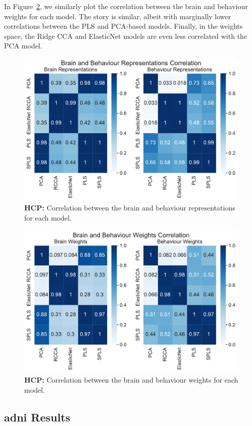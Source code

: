 In Figure~\ref{fig:brain-behaviour-weights-sim}, we similarly plot the correlation between the brain and behaviour \gls{weights} for each model. 
The story is similar, albeit with marginally lower correlations between the PLS and PCA-based models. Finally, in the weights space, the Ridge CCA and ElasticNet models are even less correlated with the PCA model.

\begin{figure}
    \centering
    \includegraphics[width=0.8\linewidth]{figures/hcp/brain and behaviour scores correlation}
    \caption{\textbf{HCP:} Correlation between the brain and behaviour \gls{representations} for each model.}\label{fig:brain-behaviour-scores-sim}
\end{figure}

\begin{figure}
    \centering
    \includegraphics[width=0.8\linewidth]{figures/hcp/brain and behaviour weights correlation}
    \caption{\textbf{HCP:} Correlation between the brain and behaviour \gls{weights} for each model.}\label{fig:brain-behaviour-weights-sim}
\end{figure}


\subsection{\acrshort{adni} Results}\label{subsec:adni}


